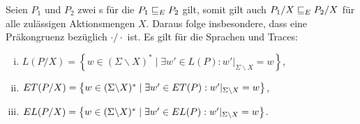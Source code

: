 \begin{Satz}
  \label{FehlerHidingSatz}
  Seien $P_1$ und $P_2$ zwei \MEIO{}s für die $P_1 \sqsubseteq  _E P_2$ gilt, somit gilt
  auch $P_1/X \sqsubseteq  _E P_2/X$ für alle zulässigen Aktionsmengen $X$. Daraus folge
  insbesondere, dass \ERel{} eine Präkongruenz bezüglich $\cdot /\cdot$ ist. Es
  gilt für die Sprachen und Traces:
  \begin{enumerate}[(i)]
    \item $L(P/X) = \left\{w\in (\Sigma\backslash X)^*\mid \exists w'\in L(P):
      w'|_{\Sigma\backslash X} = w\right\}$,
    \item $ET (P/X) = \left\{w\in (\Sigma\backslash X)^*\mid \exists w'\in
      ET(P): w'|_{\Sigma\backslash X} = w\right\}$,
    \item $EL (P/X) = \left\{w\in (\Sigma\backslash X)^*\mid \exists w'\in
      EL(P): w'|_{\Sigma\backslash X} = w\right\}$.
  \end{enumerate}
\end{Satz}
